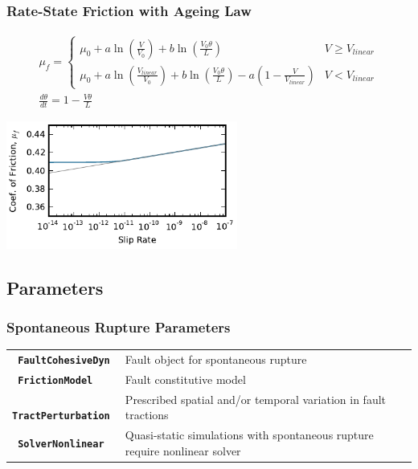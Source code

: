 \documentclass{beamer}
\begin{document}
\begin{frame}
  \frametitle{Rate-State Friction with Ageing Law}
  
  \begin{gather}
    \mu_f = \left\{ \begin{array}{ll}
        \mu_0 + a \ln (\frac{V}{V_0}) + b \ln (\frac{V_0 \theta}{L}) & V \ge V_\mathit{linear} \\
        \mu_0 + a \ln (\frac{V_\mathit{linear}}{V_0}) + b \ln
        (\frac{V_0\theta}{L}) - a (1 - \frac{V}{V_\mathit{linear}}) & V
        < V_\mathit{linear}
      \end{array} \right. \\
    \frac{d \theta}{dt} = 1 - \frac{V \theta}{L}
  \end{gather}
  \begin{center}
    \includegraphics[height=1.65in]{figs/friction_ratestate}
  \end{center}
  
\end{frame}


\subsection{Parameters}

\begin{frame}
  \frametitle{Spontaneous Rupture Parameters}
  
  \begin{tabular}{lp{3in}}
    {\tt\bf\color{green} FaultCohesiveDyn} & Fault object for
    spontaneous rupture \\
    {\tt\bf\color{green}  FrictionModel} & Fault constitutive model \\
    {\tt\bf\color{green}  TractPerturbation} & Prescribed spatial and/or temporal
    variation in fault tractions \\
    {\tt\bf\color{green}  SolverNonlinear} & Quasi-static simulations with
    spontaneous rupture require nonlinear solver
  \end{tabular}
  
\end{frame}
\end{document}
